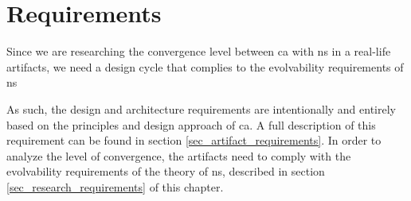 \chapter{Requirements} \label{chap_requirements} 

Since we are researching the convergence level between \gls{ca} with \gls{ns} in a
real-life artifacts, we need a design cycle that complies to the evolvability requirements
of \gls{ns} 

As such, the design and architecture requirements are intentionally and
entirely based on the principles and design approach of \gls{ca}. A full description of
this requirement can be found in section \ref{sec_artifact_requirements}. In order to
analyze the level of convergence, the artifacts need to comply with the evolvability
requirements of the theory of \gls{ns}, described in section
\ref{sec_research_requirements} of this chapter.


